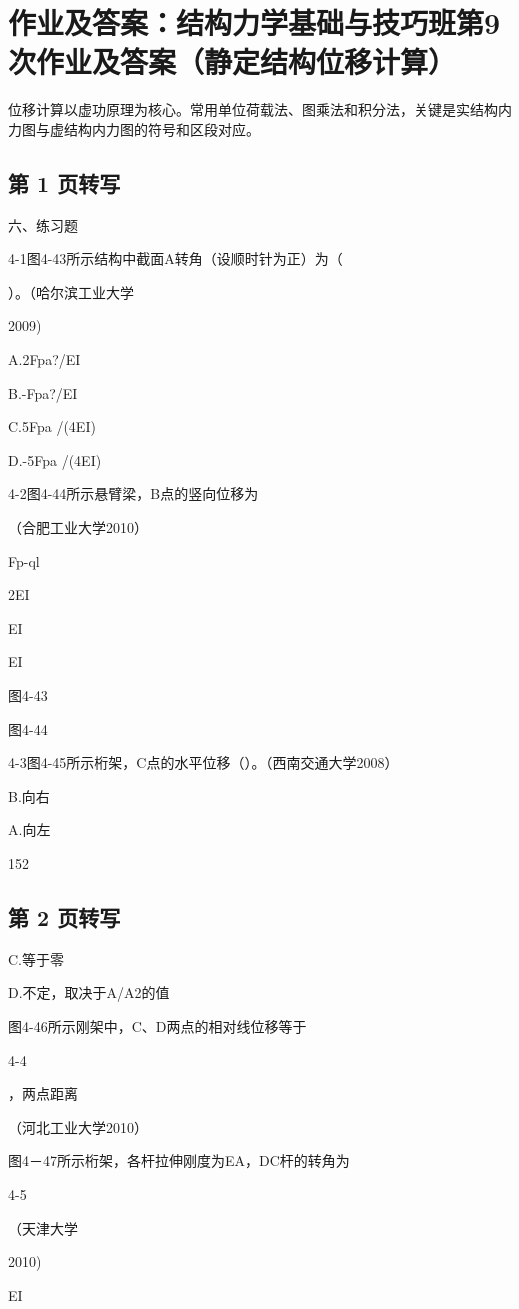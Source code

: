 \section{作业及答案：结构力学基础与技巧班第9次作业及答案（静定结构位移计算）}
\begin{analysisbox}
位移计算以虚功原理为核心。常用单位荷载法、图乘法和积分法，关键是实结构内力图与虚结构内力图的符号和区段对应。
\end{analysisbox}
\subsection*{第 1 页转写}
六、练习题

4-1图4-43所示结构中截面A转角（设顺时针为正）为（

）。（哈尔滨工业大学

2009)

A.2Fpa?/EI

B.-Fpa?/EI

C.5Fpa /(4EI)

D.-5Fpa /(4EI)

4-2图4-44所示悬臂梁，B点的竖向位移为

（合肥工业大学2010）

Fp-ql

2EI

EI

EI

图4-43

图4-44

4-3图4-45所示桁架，C点的水平位移（）。（西南交通大学2008）

B.向右

A.向左

152

\subsection*{第 2 页转写}


C.等于零

D.不定，取决于A/A2的值

图4-46所示刚架中，C、D两点的相对线位移等于

4-4

，两点距离

（河北工业大学2010）

图4－47所示桁架，各杆拉伸刚度为EA，DC杆的转角为

4-5

（天津大学

2010)

EI

